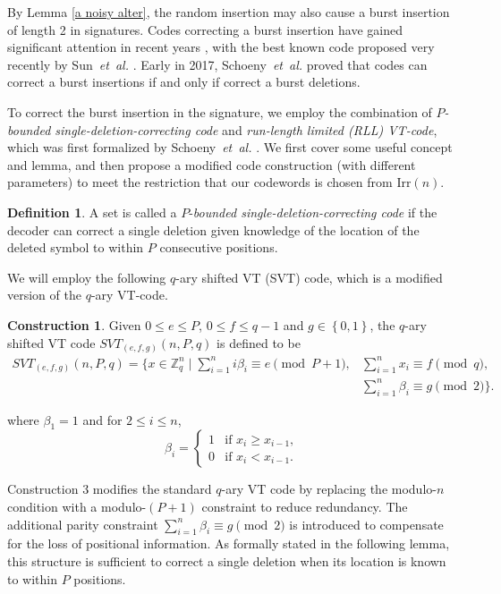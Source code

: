 \documentclass[pdflatex,sn-mathphys-num]{sn-jnl}
\theoremstyle{theorem}%
\theoremstyle{definition}
\newtheorem{definition}{Definition}
\theoremstyle{construction}
\newtheorem{construction}{Construction}
\newtheorem{open problem}{Open problem}
\begin{document}
By Lemma \ref{a noisy alter}, the random insertion may also cause a burst insertion of length 2 in signatures. Codes correcting a burst insertion have gained significant attention in recent years \cite{sw,Schoeny2,sn1, lz, wangshu 2023,song2023}, with the best known code proposed very recently by Sun~\textit{et~al.} \cite{sun2025}. Early in 2017, Schoeny~\textit{et~al.} \cite{sw} proved that codes can correct a burst insertions if and only if correct a burst deletions.\par 
To correct the burst insertion in the signature, we employ the combination of \emph{$P$-bounded single-deletion-correcting code} and\emph{ run-length limited (RLL) VT-code}, which was first formalized by  Schoeny~\textit{et~al.} \cite{sw}. We first cover some useful concept and lemma, and then propose a modified code construction (with different parameters) to meet the restriction that our codewords is chosen from $\mathrm{Irr}(n)$.
\begin{definition}
A set is called a $P$-\textit{bounded single-deletion-correcting code} if the decoder can correct a single deletion given knowledge of the location of the deleted symbol to within $P$ consecutive positions.
\end{definition}
We will employ the following $q$-ary shifted VT (SVT) code, which is a modiﬁed version of the $q$-ary VT-code.
\begin{construction} \label{SVT code}Given $0\le e\le P$, $0\le f\le q-1$ and $g\in \left\{0,1\right\}$, the $q$-ary shifted VT code $SVT_{(e,f,g)}(n,P,q)$ is defined to be 
	\begin{equation}\label{shiftvt}
		\begin{split}
			SVT_{(e,f,g)}(n,P,q) = \bigg\{ x\in\mathbb{Z}_{q}^{n}\mid 
		\displaystyle\sum_{i=1}^{n} i\beta_{i}\equiv e \pmod {P+1},&\displaystyle\sum_{i=1}^{n} x_{i}\equiv f\pmod {q},\\
		&\displaystyle\sum_{i=1}^{n}\beta_{i}\equiv g\pmod {2} \bigg\}.
		\end{split}
	\end{equation}

where $\beta_{1}=1$ and for $2 \le i \le n$, \[
\beta_{i} = 
\begin{cases} 
	1 & \text{if } x_{i} \geq x_{i-1}, \\ 
	0 & \text{if } x_{i} < x_{i-1}. 
\end{cases}
\]
\end{construction}

Construction 3 modifies the standard $q$-ary VT code by replacing the modulo-$n$ condition with a modulo-$(P+1)$ constraint to reduce redundancy. The additional parity constraint $\sum_{i=1}^{n}\beta_{i}\equiv g \pmod{2}$ is introduced to compensate for the loss of positional information. As formally stated in the following lemma, this structure is sufficient to correct a single deletion when its location is known to within $P$ positions.
\end{document}

